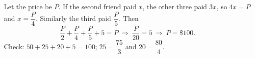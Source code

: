 Let the price be $P$. If the second friend paid $x$, the other three paid $3x$, so $4x=P$ and $x=\dfrac {P}{4}$. Similarly the third paid $\dfrac {P}{5}$. Then
\[
\dfrac {P}{2}+\dfrac {P}{4}+\dfrac {P}{5}+5=P\ \Longrightarrow\ \dfrac{P}{20}=5\ \Longrightarrow\ P=\boxed{\$100}.
\]
Check: $50+25+20+5=100$; $25=\dfrac{75}{3}$ and $20=\dfrac{80}{4}$.

